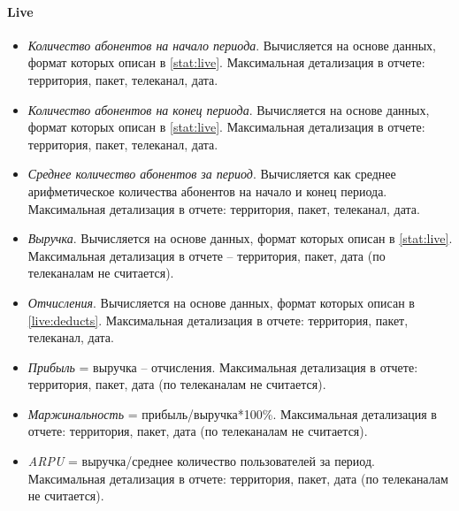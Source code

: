 \paragraph{Live}
\begin{itemize}
\item{
\textit{Количество абонентов на начало периода}. Вычисляется на основе данных, формат которых описан в \ref{stat:live}.
 Максимальная детализация в отчете: территория, пакет, телеканал, дата.
}
\item{
\textit{Количество абонентов на конец периода}. Вычисляется на основе данных, формат которых описан в \ref{stat:live}.
Максимальная детализация в отчете: территория, пакет, телеканал, дата.
}
\item{
\textit{Среднее количество абонентов за период}.  Вычисляется как среднее арифметическое количества абонентов на начало 
и конец периода. Максимальная детализация в отчете: территория, пакет, телеканал, дата.
}
\item{
\textit{Выручка}. Вычисляется на основе данных, формат которых описан в \ref{stat:live}.
Максимальная детализация в отчете – территория, пакет, дата (по телеканалам не считается).
}
\item{
\textit{Отчисления}. Вычисляется на основе данных, формат которых описан в \ref{live:deducts}.
Максимальная детализация в отчете: территория, пакет, телеканал, дата.
}
\item{
\textit{Прибыль} = выручка – отчисления. Максимальная детализация в отчете: территория, пакет, дата (по телеканалам не считается). 
}
\item{
\textit{Маржинальность} = прибыль/выручка*100\%. Максимальная детализация в отчете: территория, пакет, дата (по телеканалам не считается).
}
\item{
\textit{ARPU} = выручка/среднее количество пользователей за период. Максимальная детализация в отчете: территория, пакет, дата (по телеканалам не считается).
}
\end{itemize}

